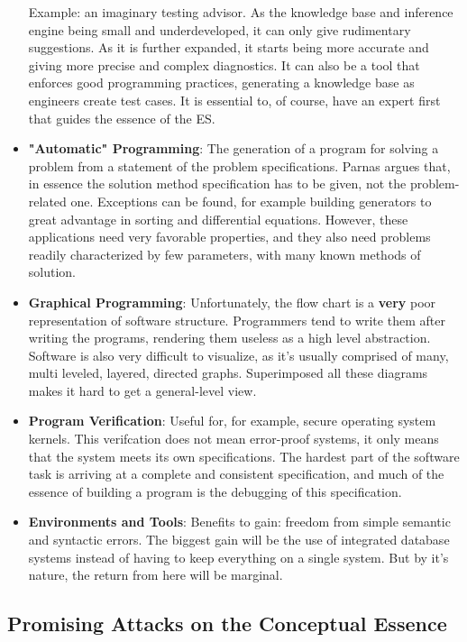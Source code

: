 \documentclass[letterpaper,12pt,parskip=full]{article}
\begin{document}
\begin{itemize}
    Example: an imaginary testing advisor. As the knowledge base and inference engine being small and underdeveloped, it can only give rudimentary suggestions. As it is further expanded, it starts being more accurate and giving more precise and complex diagnostics. It can also be a tool that enforces good programming practices, generating a knowledge base as engineers create test cases. It is essential to, of course, have an expert first that guides the essence of the ES.
    \item \textbf{"Automatic" Programming}: The generation of a program for solving a problem from a statement of the problem specifications. Parnas argues that, in essence the solution method specification has to be given, not the problem-related one. Exceptions can be found, for example building generators to great advantage in sorting and differential equations. However, these applications need very favorable properties, and they also need problems readily characterized by few parameters, with many known methods of solution.
    \item \textbf{Graphical Programming}: Unfortunately, the flow chart is a \textbf{very} poor representation of software structure. Programmers tend to write them after writing the programs, rendering them useless as a high level abstraction. Software is also very difficult to visualize, as it's usually comprised of many, multi leveled, layered, directed graphs. Superimposed all these diagrams makes it hard to get a general-level view.
    \item \textbf{Program Verification}: Useful for, for example, secure operating system kernels. This verifcation does not mean error-proof systems, it only means that the system meets its own specifications. The hardest part of the software task is arriving at a complete and consistent specification, and much of the essence of building a program is the debugging of this specification.
    \item \textbf{Environments and Tools}: Benefits to gain: freedom from simple semantic and syntactic errors. The biggest gain will be the use of integrated database systems instead of having to keep everything on a single system. But by it's nature, the return from here will be marginal.
\end{itemize}

\subsection{Promising Attacks on the Conceptual Essence}
\end{document}
